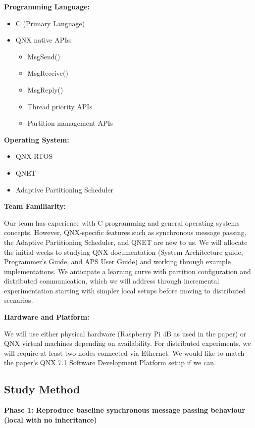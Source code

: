 \documentclass[11pt]{article}
\begin{document}
\noindent\textbf{Programming Language:}
\begin{itemize}
\item C (Primary Language)
\item QNX native APIs:
\begin{itemize}
\item MsgSend()
\item MsgReceive()
\item MsgReply()
\item Thread priority APIs
\item Partition management APIs
\end{itemize}
\end{itemize}

\noindent\textbf{Operating System:}
\begin{itemize}
\item QNX RTOS
\item QNET
\item Adaptive Partitioning Scheduler
\end{itemize}

\noindent\textbf{Team Familiarity:}

Our team has experience with C programming and general operating systems concepts. However, QNX-specific features such as synchronous message passing, the Adaptive Partitioning Scheduler, and QNET are new to us. We will allocate the initial weeks to studying QNX documentation (System Architecture guide, Programmer's Guide, and APS User Guide) and working through example implementations. We anticipate a learning curve with partition configuration and distributed communication, which we will address through incremental experimentation starting with simpler local setups before moving to distributed scenarios.

\noindent\textbf{Hardware and Platform:}

We will use either physical hardware (Raspberry Pi 4B as used in the paper) or QNX virtual machines depending on availability. For distributed experiments, we will require at least two nodes connected via Ethernet. We would like to match the paper's QNX 7.1 Software Development Platform setup if we can.

\subsection{Study Method}

\noindent\textbf{Phase 1: Reproduce baseline synchronous message passing behaviour (local with no inheritance)}
\end{document}
